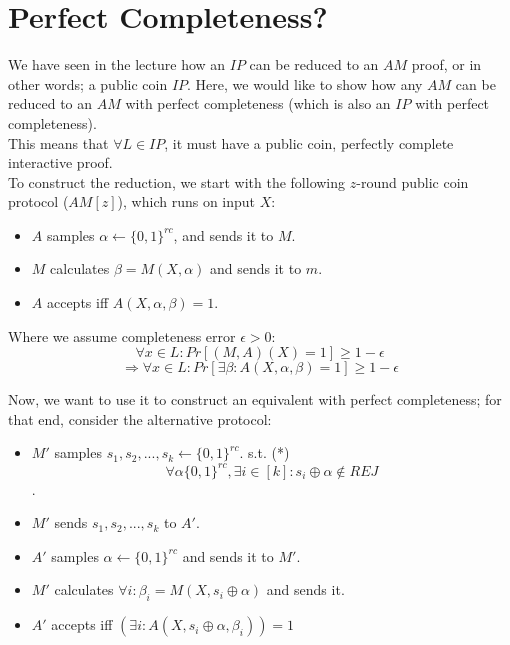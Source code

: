 \section{Perfect Completeness?}
We have seen in the lecture how an $IP$ can be reduced to an $AM$ proof, or in other words; a public coin $IP$. Here, we would like to show how any $AM$ can be reduced to an $AM$ with perfect completeness (which is also an $IP$ with perfect completeness).\\
This means that $\forall L\in IP$, it must have a public coin, perfectly complete interactive proof.\\
To construct the reduction, we start with the following $z$-round public coin protocol ($AM[z]$), which runs on input $X$:
\begin{itemize}
    \item $A$ samples $\alpha\leftarrow \{0,1\}^{rc}$, and sends it to $M$.
    \item $M$ calculates $\beta=M(X,\alpha)$ and sends it to $m$.
    \item $A$ accepts iff $A(X,\alpha,\beta)=1$.
\end{itemize}
Where we assume completeness error $\epsilon>0$:
\[\forall x\in L:
Pr[(M,A)(X)=1]\geq 1-\epsilon\]
\[\Rightarrow \forall x\in L:
Pr[\exists \beta: A(X,\alpha,\beta)=1]\geq 1-\epsilon\]


Now, we want to use it to construct an equivalent with perfect completeness; for that end, consider the alternative protocol:
\begin{itemize}
    \item $M'$ samples $s_1,s_2,...,s_k\leftarrow \{0,1\}^{rc}$. s.t. (*)
    \[\forall \alpha \{0,1\}^{rc},\exists i\in [k]: s_i\oplus \alpha\notin REJ\].
    \item $M'$ sends $s_1,s_2,...,s_k$ to $A'$.
    \item $A'$ samples $\alpha \leftarrow \{0,1\}^{rc}$ and sends it to $M'$.
    \item $M'$ calculates $\forall i: \beta_i=M(X,s_i\oplus\alpha)$ and sends it.
    \item $A'$ accepts iff $\left(\exists i:A(X,s_i\oplus\alpha, \beta_i)\right)=1$
\end{itemize}

